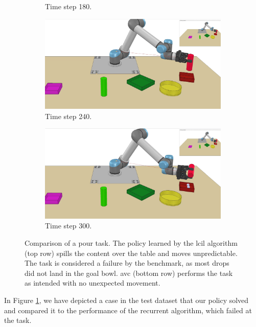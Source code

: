 \begin{figure}
\begin{subfigure}[t]{0.18\textwidth}
        \caption{Time step 180.}
    \end{subfigure}
    \begin{subfigure}[t]{0.18\textwidth}
        \includegraphics[width=\linewidth]{images/Language_Conditioned_Exp/mine_4.png}
        \caption{Time step 240.}
    \end{subfigure}
    \begin{subfigure}[t]{0.18\textwidth}
        \includegraphics[width=\linewidth]{images/Language_Conditioned_Exp/mine_5.png}
        \caption{Time step 300.}
    \end{subfigure}
    \caption{Comparison of a pour task. The policy learned by the \ac{lcil} algorithm (top row) spills the content over the table and moves unpredictable. The task is considered a failure 
    by the benchmark, as most drops did not land in the goal bowl. \ac{avc} (bottom row) performs the task as intended with no unexpected movement.}
    \label{fig: AVC vs. Rec}
\end{figure}
In Figure \ref{fig: AVC vs. Rec}, we have depicted a case in the test dataset that our policy solved and compared it to the performance 
of the recurrent algorithm, which failed at the task. \\

